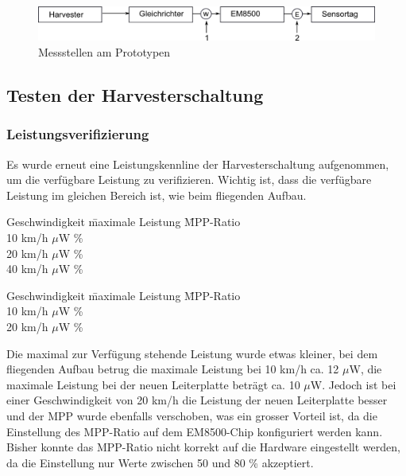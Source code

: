 \begin{figure}[ht]
  \includegraphics[width=1.0\textwidth]{3Vorgehen/imag/EnergiemessungStellen.png}               
  \caption{Messstellen am Prototypen}
  \label{EnergieMessungStellen} 
\end{figure}

\subsection{Testen der Harvesterschaltung}

\subsubsection{Leistungsverifizierung}

Es wurde erneut eine Leistungskennline der Harvesterschaltung aufgenommen, um die verfügbare Leistung zu verifizieren. Wichtig ist, dass die verfügbare Leistung im gleichen Bereich ist, wie beim fliegenden Aufbau. 

\begin{minipage}{1\textwidth}
\label{tab:leistung_fliegenden-aufbaus} 
\begin{tabbing}
    Geschwindigkeit   \quad\= maximale Leistung    \quad\= MPP-Ratio\\[0.8ex]
    10 km/h         $\mu$W   \%\\
	20 km/h         $\mu$W   \%\\
	40 km/h         $\mu$W   \%
\end{tabbing}
\end{minipage}

\label{tab:leistung_neuen_leiterplatte} 
\begin{tabbing}
    Geschwindigkeit   \quad\= maximale Leistung    \quad\= MPP-Ratio\\[0.8ex]
    10 km/h         $\mu$W   \%\\
	20 km/h         $\mu$W   \%
\end{tabbing}

Die maximal zur Verfügung stehende Leistung wurde etwas kleiner, bei dem fliegenden Aufbau betrug die maximale Leistung bei 10 km/h ca. 12 $\mu$W, die maximale Leistung bei der neuen Leiterplatte beträgt ca. 10 $\mu$W. Jedoch ist bei einer Geschwindigkeit von 20 km/h die Leistung der neuen Leiterplatte besser und der MPP wurde ebenfalls verschoben, was ein grosser Vorteil ist, da die Einstellung des MPP-Ratio auf dem EM8500-Chip konfiguriert werden kann. Bisher konnte das MPP-Ratio nicht korrekt auf die Hardware eingestellt werden, da die Einstellung nur Werte zwischen 50 und 80 \% akzeptiert.

